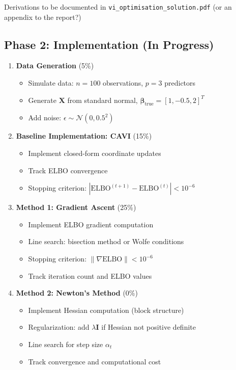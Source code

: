 \documentclass[11pt]{article}
\newcommand{\N}{\mathcal{N}}
\newcommand{\ELBO}{\text{ELBO}}
\begin{document}
Derivations to be documented in \texttt{vi\_optimisation\_solution.pdf} (or an appendix to the report?)

\subsection*{Phase 2: Implementation (In Progress)}

\begin{enumerate}[leftmargin=*]
\item \textbf{Data Generation} (5\%)
\begin{itemize}
\item Simulate data: $n = 100$ observations, $p = 3$ predictors
\item Generate $\bm{X}$ from standard normal, $\bm{\beta}_{\text{true}} = [1, -0.5, 2]^T$
\item Add noise: $\epsilon \sim \N(0, 0.5^2)$
\end{itemize}

\item \textbf{Baseline Implementation: CAVI} (15\%)
\begin{itemize}
\item Implement closed-form coordinate updates
\item Track ELBO convergence
\item Stopping criterion: $|\ELBO^{(t+1)} - \ELBO^{(t)}| < 10^{-6}$
\end{itemize}

\item \textbf{Method 1: Gradient Ascent} (25\%)
\begin{itemize}
\item Implement ELBO gradient computation
\item Line search: bisection method or Wolfe conditions
\item Stopping criterion: $\|\nabla \ELBO\| < 10^{-6}$
\item Track iteration count and ELBO values
\end{itemize}

\item \textbf{Method 2: Newton's Method} (0\%)
\begin{itemize}
\item Implement Hessian computation (block structure)
\item Regularization: add $\lambda \bm{I}$ if Hessian not positive definite
\item Line search for step size $\alpha_t$
\item Track convergence and computational cost
\end{itemize}


\end{enumerate}
\end{document}
